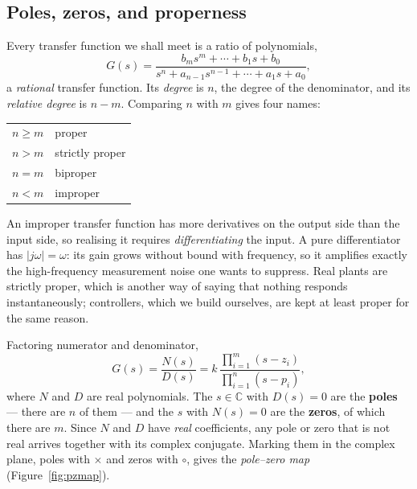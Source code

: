 \documentclass[11pt]{article}
\begin{document}
\subsection{Poles, zeros, and properness}\label{sec:polezero}
Every transfer function we shall meet is a ratio of polynomials,
\begin{equation}\label{eq:rational}
   G(s) = \frac{b_ms^{m}+\cdots+b_1s+b_0}
               {s^{n}+a_{n-1}s^{n-1}+\cdots+a_1s+a_0},
\end{equation}
a \emph{rational} transfer function. Its \emph{degree} is $n$, the degree of the
denominator, and its \emph{relative degree} is $n-m$. Comparing $n$ with $m$ gives
four names:

\begin{center}\small
\begin{tabular}{@{}ll@{}}
\toprule
$n \ge m$ & proper\\
$n > m$   & strictly proper\\
$n = m$   & biproper\\
$n < m$   & improper\\
\bottomrule
\end{tabular}
\end{center}

\begin{remark}
An improper transfer function has more derivatives on the output side than the
input side, so realising it requires \emph{differentiating} the input. A pure
differentiator has $|j\omega|=\omega$: its gain grows without bound with
frequency, so it amplifies exactly the high-frequency measurement noise one wants
to suppress. Real plants are strictly proper, which is another way of saying that
nothing responds instantaneously; controllers, which we build ourselves, are kept
at least proper for the same reason.
\end{remark}

Factoring numerator and denominator,
\begin{equation}\label{eq:factored}
   G(s) = \frac{N(s)}{D(s)}
        = k\,\frac{\prod_{i=1}^{m}(s-z_i)}{\prod_{i=1}^{n}(s-p_i)},
\end{equation}
where $N$ and $D$ are real polynomials. The $s\in\mathbb{C}$ with $D(s)=0$ are the
\textbf{poles} --- there are $n$ of them --- and the $s$ with $N(s)=0$ are the
\textbf{zeros}, of which there are $m$. Since $N$ and $D$ have \emph{real}
coefficients, any pole or zero that is not real arrives together with its complex
conjugate. Marking them in the complex plane, poles with $\times$ and zeros with
$\circ$, gives the \emph{pole--zero map} (Figure~\ref{fig:pzmap}).
\end{document}
